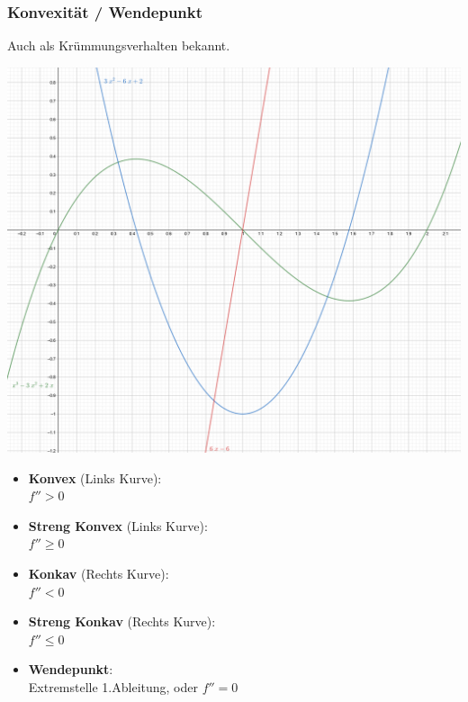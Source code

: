 \subsubsection{Konvexität / Wendepunkt }
Auch als Krümmungsverhalten bekannt.\\
\begin{minipage}{\textwidth}	
	\begin{minipage}{0.2\textwidth}
		\includegraphics[width=\linewidth,keepaspectratio=true]{./Images/konvexkonkav.png}
	\end{minipage}%
	\begin{minipage}{0.3\textwidth}	
		\begin{itemize}[nosep]
			\item \textbf{Konvex} (Links Kurve):\\ $f'' > 0$ 
			\item \textbf{Streng Konvex} (Links Kurve):\\ $f'' \geq 0$ 
			
			\item \textbf{Konkav} (Rechts Kurve):\\ $f'' < 0$ 
			\item \textbf{Streng Konkav} (Rechts Kurve):\\ $f'' \leq 0$ 
			
			\item \textbf{Wendepunkt}:\\ Extremstelle 1.Ableitung, oder $f'' = 0$
		\end{itemize}
	\end{minipage}
\end{minipage}

